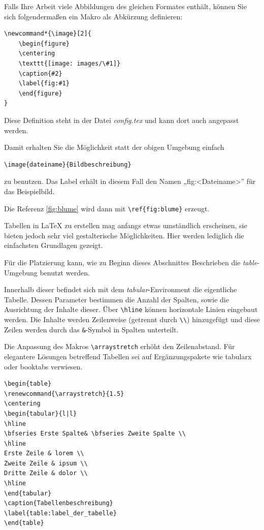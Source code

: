 Falls Ihre Arbeit viele Abbildungen des gleichen Formates enthält, können Sie sich folgendermaßen ein Makro als Abkürzung definieren:

\begin{verbatim}
\newcommand*{\image}[2]{
	\begin{figure}
	\centering
	\texttt{[image: images/\#1]}
	\caption{#2}
	\label{fig:#1}
	\end{figure}
}
\end{verbatim}
Diese Definition steht in der Datei \emph{config.tex} und kann dort auch angepasst werden.

Damit erhalten Sie die Möglichkeit statt der obigen Umgebung einfach
\begin{verbatim}
\image{dateiname}{Bildbeschreibung}
\end{verbatim}
zu benutzen. Das Label erhält in diesem Fall den Namen „fig:<Dateiname>” für das Beispielbild.


Die Referenz \ref{fig:blume} wird dann mit \verb+\ref{fig:blume}+ erzeugt.


Tabellen in \LaTeX{} zu erstellen mag anfangs etwas umständlich erscheinen, sie bieten jedoch sehr viel gestalterische Möglichkeiten. Hier werden lediglich die einfachsten Grundlagen gezeigt.

Für die Platzierung kann, wie zu Beginn dieses Abschnittes Beschrieben die \emph{table}-Umgebung benutzt werden.

Innerhalb dieser befindet sich mit dem \emph{tabular}-Environment die eigentliche Tabelle.
Dessen Parameter bestimmen die Anzahl der Spalten, sowie die Ausrichtung der Inhalte dieser.
Über \verb|\hline| können horizontale Linien eingebaut werden.
Die Inhalte werden Zeilenweise (getrennt durch \verb|\\|) hinzugefügt und diese Zeilen werden durch das \verb|&|-Symbol in Spalten unterteilt.

Die Anpassung des Makros \verb+\arraystretch+ erhöht den Zeilenabstand. Für elegantere Lösungen betreffend Tabellen sei auf Ergänzungspakete wie tabularx \citep{latex:tabularx} oder booktabs \citep{latex:booktabs} verwiesen.

\begin{verbatim}
\begin{table}
\renewcommand{\arraystretch}{1.5}
\centering
\begin{tabular}{l|l}
\hline
\bfseries Erste Spalte& \bfseries Zweite Spalte \\
\hline
Erste Zeile & lorem \\
Zweite Zeile & ipsum \\
Dritte Zeile & dolor \\
\hline
\end{tabular}
\caption{Tabellenbeschreibung}
\label{table:label_der_tabelle}
\end{table}
\end{verbatim}

